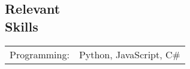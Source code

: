 \documentclass[margin,line,pifont,palatino,courier]{res}
\begin{document}
\begin{resume}

\section{\sc Relevant \\ Skills}

\begin{tabular}{@{}p{0.8in}p{6in}}

Programming:& Python, JavaScript, C\#\\

\end{tabular}




\end{resume}
\end{document}
